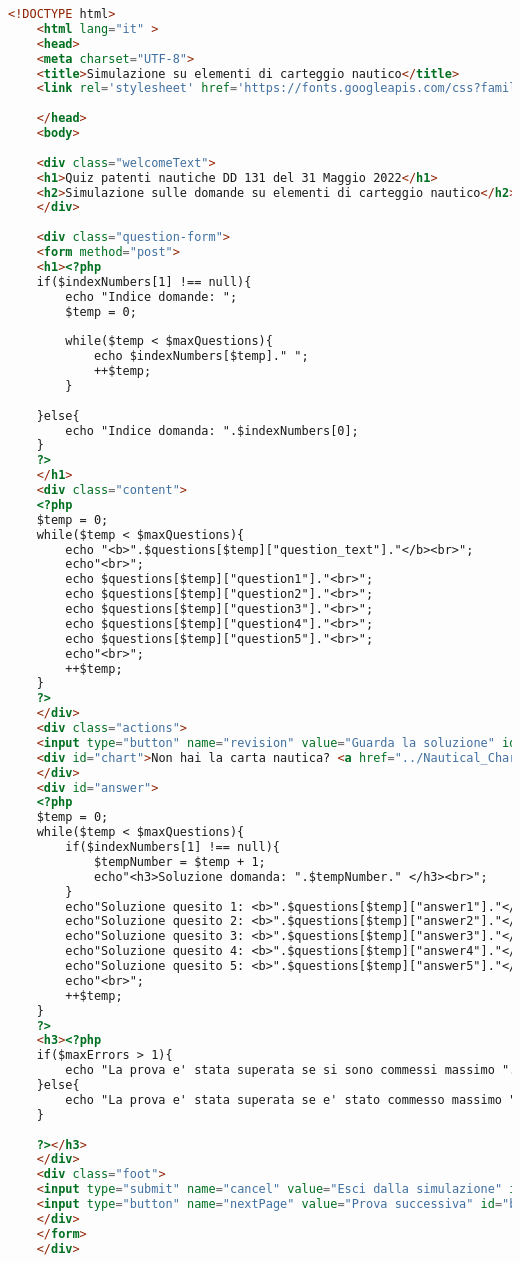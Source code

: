 \begin{lstlisting}[language=html]
	<!DOCTYPE html>
	<html lang="it" >
	<head>
	<meta charset="UTF-8">
	<title>Simulazione su elementi di carteggio nautico</title>
	<link rel='stylesheet' href='https://fonts.googleapis.com/css?family=Rubik:400,700'><link rel="stylesheet" href="simulationStyle.css">
	
	</head>
	<body>  
	
	<div class="welcomeText">
	<h1>Quiz patenti nautiche DD 131 del 31 Maggio 2022</h1>
	<h2>Simulazione sulle domande su elementi di carteggio nautico</h2>
	</div>
	
	<div class="question-form">
	<form method="post">
	<h1><?php
	if($indexNumbers[1] !== null){
		echo "Indice domande: ";
		$temp = 0;
		
		while($temp < $maxQuestions){
			echo $indexNumbers[$temp]." ";
			++$temp;
		}
		
	}else{
		echo "Indice domanda: ".$indexNumbers[0];
	}
	?>
	</h1>
	<div class="content">
	<?php 
	$temp = 0;
	while($temp < $maxQuestions){
		echo "<b>".$questions[$temp]["question_text"]."</b><br>";
		echo"<br>";
		echo $questions[$temp]["question1"]."<br>";
		echo $questions[$temp]["question2"]."<br>";
		echo $questions[$temp]["question3"]."<br>";
		echo $questions[$temp]["question4"]."<br>";
		echo $questions[$temp]["question5"]."<br>";
		echo"<br>";
		++$temp;
	}
	?> 
	</div>
	<div class="actions">
	<input type="button" name="revision" value="Guarda la soluzione" id="revision" onclick="check()"/>
	<div id="chart">Non hai la carta nautica? <a href="../Nautical_Charts/Carta_Nautica_5D.pdf" download> Scaricala qui</a></div>
	</div>
	<div id="answer">
	<?php
	$temp = 0;
	while($temp < $maxQuestions){
		if($indexNumbers[1] !== null){
			$tempNumber = $temp + 1;
			echo"<h3>Soluzione domanda: ".$tempNumber." </h3><br>"; 
		}
		echo"Soluzione quesito 1: <b>".$questions[$temp]["answer1"]."</b><br>";
		echo"Soluzione quesito 2: <b>".$questions[$temp]["answer2"]."</b><br>";
		echo"Soluzione quesito 3: <b>".$questions[$temp]["answer3"]."</b><br>";
		echo"Soluzione quesito 4: <b>".$questions[$temp]["answer4"]."</b><br>";
		echo"Soluzione quesito 5: <b>".$questions[$temp]["answer5"]."</b><br>";
		echo"<br>";
		++$temp;
	}
	?>
	<h3><?php
	if($maxErrors > 1){
		echo "La prova e' stata superata se si sono commessi massimo ".$maxErrors." errori.";
	}else{
		echo "La prova e' stata superata se e' stato commesso massimo ".$maxErrors." errore.";  
	}
	
	?></h3>
	</div>
	<div class="foot">
	<input type="submit" name="cancel" value="Esci dalla simulazione" id="button2"/>
	<input type="button" name="nextPage" value="Prova successiva" id="button1" onclick="next()"/>
	</div>
	</form>
	</div>
\end{lstlisting}

